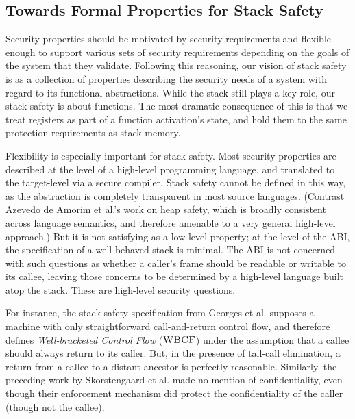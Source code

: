 \documentclass[10pt,conference]{ieeetran}%
\theoremstyle{definition}
\begin{document}
\subsection {Towards Formal Properties for Stack Safety}


Security properties should be motivated by security requirements
and flexible enough to support various sets of security requirements depending on the
goals of the system that they validate.
Following this reasoning, our vision of stack safety is as a collection of properties
describing the security needs of a system with regard to its functional abstractions.
While the stack still plays a key role, our stack safety is about functions. The most
dramatic consequence of this is that we treat registers as part of a function activation's
state, and hold them to the same protection requirements as stack memory.

Flexibility is especially important for stack safety.
%
Most security properties are described at the level of a high-level programming language,
and translated to the target-level via a secure compiler. Stack safety cannot
be defined in this way, as the abstraction is completely transparent in most source languages.
(Contrast Azevedo de Amorim et al.'s \cite{DBLP:conf/post/AmorimHP18} work on heap safety,
which is broadly consistent across language semantics, and therefore
amenable to a very general high-level approach.)
%
But it is not satisfying as a low-level property; at the level of the ABI, the
specification of a well-behaved stack is minimal. The ABI is not concerned with such
questions as whether a caller's frame should be readable or writable to its callee,
leaving those concerns to be determined by a high-level language built atop the stack.
These are high-level security questions.

For instance, the stack-safety specification from Georges et al.
\cite{Georges22:TempsDesCerises} supposes a machine with only straightforward call-and-return
control flow, and therefore defines {\em Well-bracketed Control Flow} (\(\textnormal{\sc WBCF}\)) under the assumption that
a callee should always return to its caller. But, in the presence of tail-call elimination, a
return from a callee to a distant ancestor is perfectly reasonable. Similarly, the preceding work by
Skorstengaard et al. \cite{SkorstengaardSTKJFP} made no mention of confidentiality, even though
their enforcement mechanism did protect the confidentiality of the caller (though not the callee).
\end{document}
